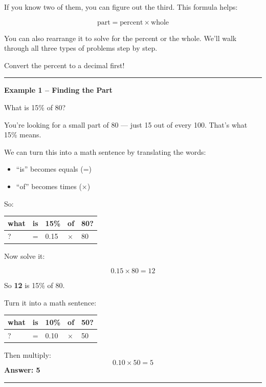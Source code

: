 \documentclass[
  letterpaper,
  DIV=11,
  numbers=noendperiod]{scrreprt}
\providecommand{\tightlist}{%
  \setlength{\itemsep}{0pt}\setlength{\parskip}{0pt}}
\begin{document}
If you know two of them, you can figure out the third. This formula
helps:

\[
\text{part} = \text{percent} \times \text{whole}
\]

You can also rearrange it to solve for the percent or the whole. We'll
walk through all three types of problems step by step.

Convert the percent to a decimal first!

\begin{center}\rule{0.5\linewidth}{0.5pt}\end{center}

\textbf{Example 1 -- Finding the Part}

What is 15\% of 80?

You're looking for a small part of 80 --- just 15 out of every 100.
That's what 15\% means.

We can turn this into a math sentence by translating the words:

\begin{itemize}
\tightlist
\item
  ``is'' becomes equals (=)
\item
  ``of'' becomes times (×)
\end{itemize}

So:

\begin{longtable}[]{@{}lllll@{}}
\toprule\noalign{}
what & is & 15\% & of & 80? \\
\midrule\noalign{}
\endhead
\bottomrule\noalign{}
\endlastfoot
? & = & 0.15 & \(\times\) & 80 \\
\end{longtable}

Now solve it:

\[
0.15×80=12
\]

So \textbf{12} is 15\% of 80.

Turn it into a math sentence:

\begin{longtable}[]{@{}lllll@{}}
\toprule\noalign{}
what & is & 10\% & of & 50? \\
\midrule\noalign{}
\endhead
\bottomrule\noalign{}
\endlastfoot
? & = & 0.10 & × & 50 \\
\end{longtable}

Then multiply: \[
0.10 \times 50 = 5
\] \textbf{Answer: 5}

\begin{center}\rule{0.5\linewidth}{0.5pt}\end{center}
\end{document}
